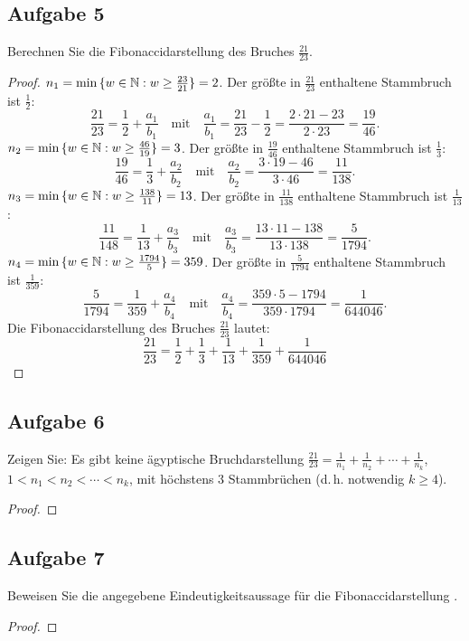 \subsection{Aufgabe 5}
Berechnen Sie die Fibonaccidarstellung des Bruches $\frac{21}{23}$.
\begin{proof}
  $n_1 = \min{\{ w \in \mathbb{N}: w \geq \frac{23}{21} \}} = 2$.
  Der größte in $\frac{21}{23}$ enthaltene Stammbruch ist $\frac{1}{2}$:
  \begin{equation*}
    \frac{21}{23} = \frac{1}{2} + \frac{a_1}{b_1} \quad \text{mit}
    \quad \frac{a_1}{b_1} = \frac{21}{23} - \frac{1}{2} =
    \frac{2 \cdot 21 - 23}{2 \cdot 23} = \frac{19}{46}.
  \end{equation*}
  $n_2 = \min{\{ w \in \mathbb{N}: w \geq \frac{46}{19} \}} = 3$.
  Der größte in $\frac{19}{46}$ enthaltene Stammbruch ist $\frac{1}{3}$:
  \begin{equation*}
    \frac{19}{46} = \frac{1}{3} + \frac{a_2}{b_2} \quad \text{mit}
    \quad \frac{a_2}{b_2} =
    \frac{3 \cdot 19 - 46}{3 \cdot 46} = \frac{11}{138}.
  \end{equation*}
  $n_3 = \min{\{ w \in \mathbb{N}: w \geq \frac{138}{11} \}} = 13$.
  Der größte in $\frac{11}{138}$ enthaltene Stammbruch ist $\frac{1}{13}$:
  \begin{equation*}
    \frac{11}{148} = \frac{1}{13} + \frac{a_3}{b_3} \quad \text{mit}
    \quad \frac{a_3}{b_3} =
    \frac{13 \cdot 11 - 138}{13 \cdot 138} = \frac{5}{1794}.
  \end{equation*}
  $n_4 = \min{\{ w \in \mathbb{N}: w \geq \frac{1794}{5} \}} = 359$.
  Der größte in $\frac{5}{1794}$ enthaltene Stammbruch ist $\frac{1}{359}$:
  \begin{equation*}
    \frac{5}{1794} = \frac{1}{359} + \frac{a_4}{b_4} \quad \text{mit}
    \quad \frac{a_4}{b_4} =
    \frac{359 \cdot 5 - 1794}{359 \cdot 1794} = \frac{1}{644046}.
  \end{equation*}
  Die Fibonaccidarstellung des Bruches $\frac{21}{23}$ lautet:
  \begin{equation*}
    \frac{21}{23} = \frac{1}{2} + \frac{1}{3} +
    \frac{1}{13} + \frac{1}{359} + \frac{1}{644046}
  \end{equation*}
\end{proof}

\subsection{Aufgabe 6}
Zeigen Sie: Es gibt keine ägyptische Bruchdarstellung
$\frac{21}{23} = \frac{1}{n_1} + \frac{1}{n_2} + \dotsb + \frac{1}{n_k}$,
$1 < n_1 < n_2 < \dotsb < n_k$, mit höchstens 3 Stammbrüchen
(d.\,h. notwendig $k \geq 4$).
\begin{proof}
\end{proof}

\subsection{Aufgabe 7}
Beweisen Sie die angegebene Eindeutigkeitsaussage für die Fibonaccidarstellung
\parencite[53]{book:zahlentheorie}.
\begin{proof}
\end{proof}
